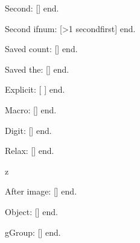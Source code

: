\documentclass{article}
\def\formtwo{2}
\begin{document}
Second: [\pdfxformname\pdflastxform] end.

Second ifnum: [\ifnum\pdfxformname\pdflastxform>1 second\else first\fi] end.

Saved count: [\pdfxformname\formno] end.

Saved the: [\pdfxformname\savedform] end.

Explicit: [ ] end.

Macro: [\pdfxformname\formtwo] end.

Digit: [\pdfxformname{}] end.

Relax: [\pdfxformname\pdflastxform\relax] end.

\immediate{}%
\hbox{z}

After image: [\pdfxformname\pdflastxform] end.

Object: [\the\pdflastxform] end.

{\hbox{g}}Group: [\pdfxformname\pdflastxform] end.
\end{document}
